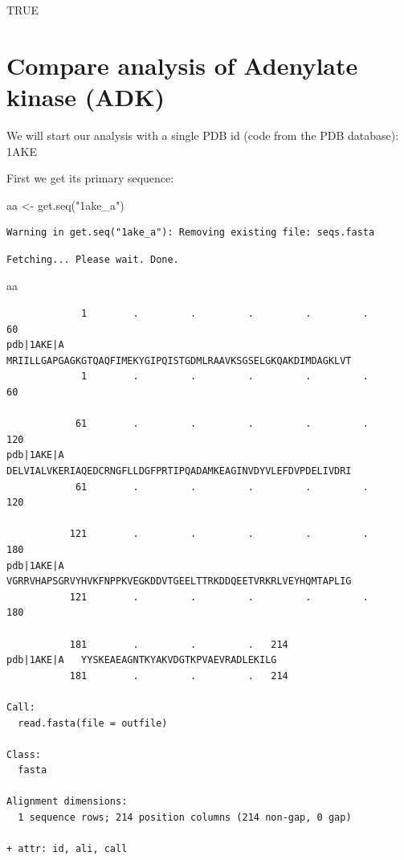 \documentclass[
  letterpaper,
  DIV=11,
  numbers=noendperiod]{scrartcl}
\newenvironment{Shaded}{\begin{snugshade}}{\end{snugshade}}
\newcommand{\FunctionTok}[1]{\textcolor[rgb]{0.28,0.35,0.67}{#1}}
\newcommand{\NormalTok}[1]{\textcolor[rgb]{0.00,0.23,0.31}{#1}}
\newcommand{\OtherTok}[1]{\textcolor[rgb]{0.00,0.23,0.31}{#1}}
\newcommand{\StringTok}[1]{\textcolor[rgb]{0.13,0.47,0.30}{#1}}
\begin{document}
TRUE

\hypertarget{compare-analysis-of-adenylate-kinase-adk}{%
\section{Compare analysis of Adenylate kinase
(ADK)}\label{compare-analysis-of-adenylate-kinase-adk}}

We will start our analysis with a single PDB id (code from the PDB
database): 1AKE

First we get its primary sequence:

\begin{Shaded}
\begin{Highlighting}[]
\NormalTok{aa }\OtherTok{\textless{}{-}} \FunctionTok{get.seq}\NormalTok{(}\StringTok{"1ake\_a"}\NormalTok{)}
\end{Highlighting}
\end{Shaded}

\begin{verbatim}
Warning in get.seq("1ake_a"): Removing existing file: seqs.fasta
\end{verbatim}

\begin{verbatim}
Fetching... Please wait. Done.
\end{verbatim}

\begin{Shaded}
\begin{Highlighting}[]
\NormalTok{aa}
\end{Highlighting}
\end{Shaded}

\begin{verbatim}
             1        .         .         .         .         .         60 
pdb|1AKE|A   MRIILLGAPGAGKGTQAQFIMEKYGIPQISTGDMLRAAVKSGSELGKQAKDIMDAGKLVT
             1        .         .         .         .         .         60 

            61        .         .         .         .         .         120 
pdb|1AKE|A   DELVIALVKERIAQEDCRNGFLLDGFPRTIPQADAMKEAGINVDYVLEFDVPDELIVDRI
            61        .         .         .         .         .         120 

           121        .         .         .         .         .         180 
pdb|1AKE|A   VGRRVHAPSGRVYHVKFNPPKVEGKDDVTGEELTTRKDDQEETVRKRLVEYHQMTAPLIG
           121        .         .         .         .         .         180 

           181        .         .         .   214 
pdb|1AKE|A   YYSKEAEAGNTKYAKVDGTKPVAEVRADLEKILG
           181        .         .         .   214 

Call:
  read.fasta(file = outfile)

Class:
  fasta

Alignment dimensions:
  1 sequence rows; 214 position columns (214 non-gap, 0 gap) 

+ attr: id, ali, call
\end{verbatim}
\end{document}
